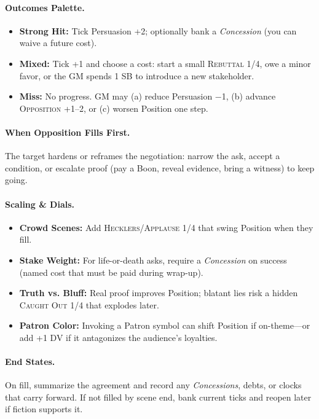 \paragraph{Outcomes Palette.}
\begin{itemize}
  \item \textbf{Strong Hit:} Tick Persuasion +2; optionally bank a \emph{Concession} (you can waive a future cost).
  \item \textbf{Mixed:} Tick +1 and choose a cost: start a small \textsc{Rebuttal 1/4}, owe a minor favor, or the GM spends 1 SB to introduce a new stakeholder.
  \item \textbf{Miss:} No progress. GM may (a) reduce Persuasion −1, (b) advance \textsc{Opposition} +1–2, or (c) worsen Position one step.
\end{itemize}

\paragraph{When Opposition Fills First.}
The target hardens or reframes the negotiation: narrow the ask, accept a condition, or escalate proof (pay a Boon, reveal evidence, bring a witness) to keep going.

\paragraph{Scaling & Dials.}
\begin{itemize}
  \item \textbf{Crowd Scenes:} Add \textsc{Hecklers}/\textsc{Applause} 1/4 that swing Position when they fill.
  \item \textbf{Stake Weight:} For life-or-death asks, require a \emph{Concession} on success (named cost that must be paid during wrap-up).
  \item \textbf{Truth vs. Bluff:} Real proof improves Position; blatant lies risk a hidden \textsc{Caught Out} 1/4 that explodes later.
  \item \textbf{Patron Color:} Invoking a Patron symbol can shift Position if on-theme—or add +1 DV if it antagonizes the audience’s loyalties.
\end{itemize}

\paragraph{End States.}
On fill, summarize the agreement and record any \emph{Concessions}, debts, or clocks that carry forward. If not filled by scene end, bank current ticks and reopen later if fiction supports it.


